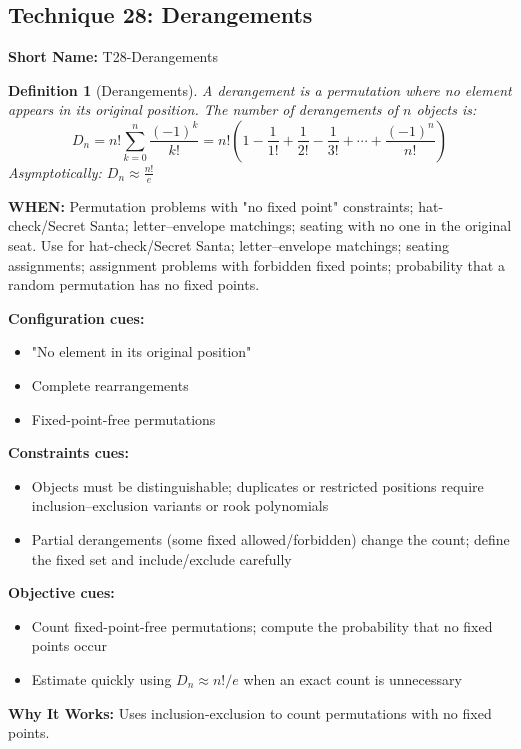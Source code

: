 \documentclass[12pt]{article}
\newtheorem{definition}{Definition}[section]
\begin{document}
\subsection{Technique 28: Derangements}
\textbf{Short Name:} T28-Derangements

\begin{definition}[Derangements]
A derangement is a permutation where no element appears in its original position.
The number of derangements of $n$ objects is:
\[
D_n = n! \sum_{k=0}^{n} \frac{(-1)^k}{k!} = n! \left(1 - \frac{1}{1!} + \frac{1}{2!} - \frac{1}{3!} + \cdots + \frac{(-1)^n}{n!}\right)
\]
Asymptotically: $D_n \approx \frac{n!}{e}$
\end{definition}

\textbf{WHEN:} Permutation problems with "no fixed point" constraints; hat-check/Secret Santa; letter–envelope matchings; seating with no one in the original seat. Use for hat-check/Secret Santa; letter–envelope matchings; seating assignments; assignment problems with forbidden fixed points; probability that a random permutation has no fixed points.

\textbf{Configuration cues:}
\begin{itemize}
    \item "No element in its original position"
    \item Complete rearrangements
    \item Fixed-point-free permutations
\end{itemize}

\textbf{Constraints cues:}
\begin{itemize}
    \item Objects must be distinguishable; duplicates or restricted positions require inclusion--exclusion variants or rook polynomials
    \item Partial derangements (some fixed allowed/forbidden) change the count; define the fixed set and include/exclude carefully
\end{itemize}

\textbf{Objective cues:}
\begin{itemize}
    \item Count fixed-point-free permutations; compute the probability that no fixed points occur
    \item Estimate quickly using $D_n \approx n!/e$ when an exact count is unnecessary
\end{itemize}

\textbf{Why It Works:} Uses inclusion-exclusion to count permutations with no fixed points.
\end{document}
